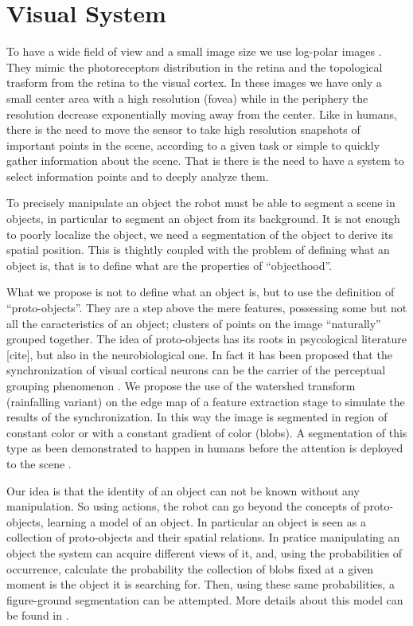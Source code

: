 \section{Visual System}
To have a wide field of view and a small image size we use log-polar images \cite{sandini80retinalike}. They mimic the photoreceptors distribution in the retina and the topological trasform from the retina to the visual cortex. In these images we have only a small center area with a high resolution (fovea) while in the periphery the resolution decrease exponentially moving away from the center. Like in humans, there is the need to move the sensor to take high resolution snapshots of important points in the scene, according to a given task or simple to quickly gather information about the scene. That is there is the need to have a system to select information points and to deeply analyze them.

To precisely manipulate an object the robot must be able to segment a scene in objects, in particular to segment an object from its background. It is not enough to poorly localize the object, we need a segmentation of the object to derive its spatial position. This is thightly coupled with the problem of defining what an object is, that is to define what are the properties of ``objecthood''.

What we propose is not to define what an object is, but to use the definition of ``proto-objects''. They are a step above the mere features, possessing some but not all the caracteristics of an object; clusters of points on the image ``naturally'' grouped together. The idea of proto-objects has its roots in psycological literature [cite], but also in the neurobiological one. In fact it has been proposed that the synchronization of visual cortical neurons can be the carrier of the perceptual grouping phenomenon \cite{eckhorn88coherent,gray89oscillatory}. We propose the use of the watershed transform (rainfalling variant) \cite{smet00rainfalling} on the edge map of a feature extraction stage to simulate the results of the synchronization. In this way the image is segmented in region of constant color or with a constant gradient of color (blobs). A segmentation of this type as been demonstrated to happen in humans before the attention is deployed to the scene \cite{driver00segmentation}.

Our idea is that the identity of an object can not be known without any manipulation. So using actions, the robot can go beyond the concepts of proto-objects, learning a model of an object. In particular an object is seen as a collection of proto-objects and their spatial relations. In pratice manipulating an object the system can acquire different views of it, and, using the probabilities of occurrence, calculate the probability the collection of blobs fixed at a given moment is the object it is searching for. Then, using these same probabilities, a figure-ground segmentation can be attempted. More details about this model can be found in \cite{orabona05object}.

